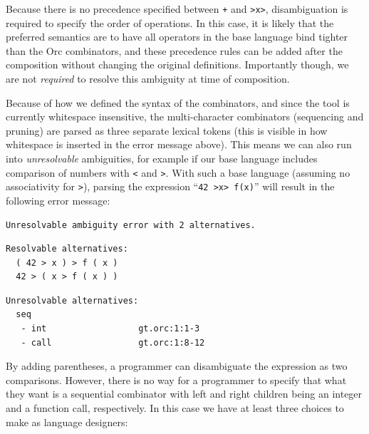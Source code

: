 \documentclass[acmsmall,review,anonymous]{acmart}\settopmatter{printfolios=true,printccs=false,printacmref=false}
\newcommand{\ocaml}{\lstinline[language={[objective]caml}]}
\begin{document}
\noindent
Because there is no precedence specified between \ocaml{+} and
\ocaml{>x>}, disambiguation is required to specify the order of
operations.
%
In this case, it is likely that the preferred semantics are to have
all operators in the base language bind tighter than the Orc
combinators, and these precedence rules can be added after the
composition without changing the original definitions. Importantly
though, we are not \emph{required} to resolve this ambiguity at
time of composition.

Because of how we defined the syntax of the combinators, and since
the tool is currently whitespace insensitive, the
multi-character combinators (sequencing and pruning) are parsed as
three separate lexical tokens (this is visible in how whitespace
is inserted in the error message above). This means we can also
run into \emph{unresolvable} ambiguities, for example if our base
language includes comparison of numbers with \ocaml{<} and
\ocaml{>}. With such a base language (assuming no associativity
for \ocaml{>}), parsing the expression
%
``\ocaml{42 >x> f(x)}''
%
will result in the following error message:

{\small
\begin{lstlisting}[language={[objective]caml}]
Unresolvable ambiguity error with 2 alternatives.
\end{lstlisting}

\begin{minipage}{.3\textwidth}
\begin{lstlisting}[language={[objective]caml}]
Resolvable alternatives:
  ( 42 > x ) > f ( x )
  42 > ( x > f ( x ) )
\end{lstlisting}
\end{minipage}
\hfill
\begin{minipage}{.5\textwidth}
\begin{lstlisting}[language={[objective]caml}]
Unresolvable alternatives:
  seq
   - int                  gt.orc:1:1-3
   - call                 gt.orc:1:8-12
\end{lstlisting}
\end{minipage}
}

\noindent
By adding parentheses, a programmer can disambiguate the
expression as two comparisons. However, there is no way for a
programmer to specify that what they want is a sequential
combinator with left and right children being an integer and a
function call, respectively. In this case we have at least three
choices to make as language designers:
\end{document}
